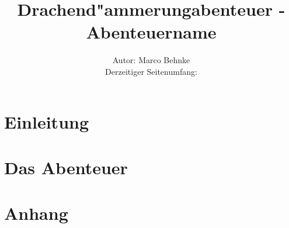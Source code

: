 

\title{Drachend"ammerungabenteuer -\\Abenteuername}
\author{Autor: Marco Behnke\\
      Derzeitiger Seitenumfang: \pageref{TotalPages}
      }


        \sffamily
        \frontmatter
                \maketitle\newpage
                \tableofcontents
        
        \mainmatter
                \part{Einleitung}
            
                \part{Das Abenteuer}
            
            
            
                \part{Anhang}
                        \appendix
            
            

